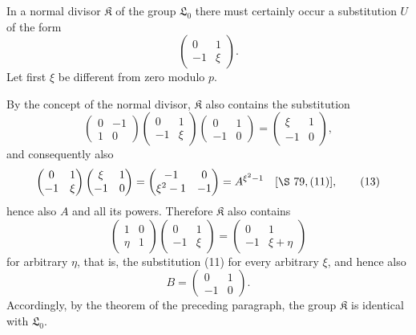 \documentclass[11pt]{article}
\providecommand{\Lzero}{\mathfrak L_0}
\providecommand{\Kgrp}{\mathfrak K}
\begin{document}
In a normal divisor $\Kgrp$ of the group $\Lzero$ there must certainly occur a substitution $U$ of the form
\begin{equation}
 \begin{pmatrix}0&1\\-1&\xi\end{pmatrix}.
\tag{11}
\end{equation}
Let first $\xi$ be different from zero modulo $p$.

By the concept of the normal divisor, $\Kgrp$ also contains the substitution
\begin{equation}
 \begin{pmatrix}0&-1\\1&0\end{pmatrix}
 \begin{pmatrix}0&1\\-1&\xi\end{pmatrix}
 \begin{pmatrix}0&1\\-1&0\end{pmatrix}
 =
 \begin{pmatrix}\xi&1\\-1&0\end{pmatrix},
\tag{12}
\end{equation}
and consequently also
\begin{equation}
 \begin{pmatrix}0&1\\-1&\xi\end{pmatrix}
 \begin{pmatrix}\xi&1\\-1&0\end{pmatrix}
 =
 \begin{pmatrix}-1&0\\ \xi^2-1&-1\end{pmatrix}
 =A^{\xi^2-1}\quad[\S~79,(11)],
\tag{13}
\end{equation}
hence also $A$ and all its powers. Therefore $\Kgrp$ also contains
\begin{equation}
 \begin{pmatrix}1&0\\ \eta&1\end{pmatrix}
 \begin{pmatrix}0&1\\-1&\xi\end{pmatrix}
 =
 \begin{pmatrix}0&1\\-1&\xi+
\eta\end{pmatrix}
\tag{14}
\end{equation}
for arbitrary $\eta$, that is, the substitution (11) for every arbitrary $\xi$, and hence also
\[
 B=\begin{pmatrix}0&1\\-1&0\end{pmatrix}.
\]
Accordingly, by the theorem of the preceding paragraph, the group $\Kgrp$ is identical with $\Lzero$.
\end{document}
